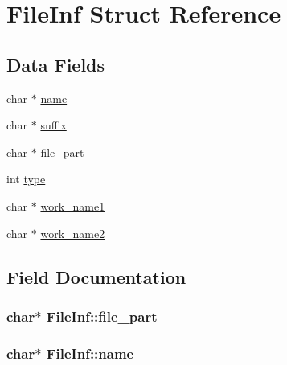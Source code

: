 \hypertarget{structFileInf}{}\section{File\+Inf Struct Reference}
\label{structFileInf}
\subsection*{Data Fields}
\begin{DoxyCompactItemize}
\item 
char $\ast$ \hyperlink{structFileInf_a4dc1b0d5b390f714210d47b147af9e9b}{name}
\item 
char $\ast$ \hyperlink{structFileInf_a5ef754a773b84e5a9917436c6d8afe72}{suffix}
\item 
char $\ast$ \hyperlink{structFileInf_acb68ba4e07ba186e94a267560253b2bb}{file\+\_\+part}
\item 
int \hyperlink{structFileInf_a08c8fec214c452fa67b03a36ac58db5f}{type}
\item 
char $\ast$ \hyperlink{structFileInf_aab7c6e078d6f1ae349cf70872f35531d}{work\+\_\+name1}
\item 
char $\ast$ \hyperlink{structFileInf_a73706e94bc2b8654cfba501d8fce856e}{work\+\_\+name2}
\end{DoxyCompactItemize}


\subsection{Field Documentation}
\subsubsection[{\texorpdfstring{file\+\_\+part}{file_part}}]{\setlength{\rightskip}{0pt plus 5cm}char$\ast$ File\+Inf\+::file\+\_\+part}\hypertarget{structFileInf_acb68ba4e07ba186e94a267560253b2bb}{}\label{structFileInf_acb68ba4e07ba186e94a267560253b2bb}
\subsubsection[{\texorpdfstring{name}{name}}]{\setlength{\rightskip}{0pt plus 5cm}char$\ast$ File\+Inf\+::name}\hypertarget{structFileInf_a4dc1b0d5b390f714210d47b147af9e9b}{}\label{structFileInf_a4dc1b0d5b390f714210d47b147af9e9b}

